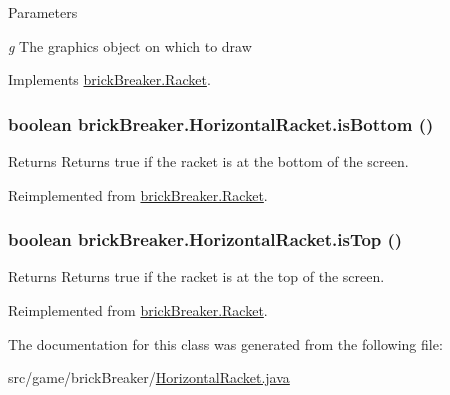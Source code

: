 \begin{DoxyParams}{Parameters}
\item[{\em g}]The graphics object on which to draw \end{DoxyParams}


Implements \hyperlink{classbrick_breaker_1_1_racket_a6ca0308def67e0955522a0e0beb430e9}{brickBreaker.Racket}.

\hypertarget{classbrick_breaker_1_1_horizontal_racket_aef823257f470172eb2caacfa95a61b99}{
\subsubsection[{isBottom}]{\setlength{\rightskip}{0pt plus 5cm}boolean brickBreaker.HorizontalRacket.isBottom ()}}
\label{classbrick_breaker_1_1_horizontal_racket_aef823257f470172eb2caacfa95a61b99}
\begin{DoxyReturn}{Returns}
Returns true if the racket is at the bottom of the screen. 
\end{DoxyReturn}


Reimplemented from \hyperlink{classbrick_breaker_1_1_racket_a908f0a42e73739db9fd0734d6a4fdb2f}{brickBreaker.Racket}.

\hypertarget{classbrick_breaker_1_1_horizontal_racket_a12688619999a3e4d302449ab4bcd0e3d}{
\subsubsection[{isTop}]{\setlength{\rightskip}{0pt plus 5cm}boolean brickBreaker.HorizontalRacket.isTop ()}}
\label{classbrick_breaker_1_1_horizontal_racket_a12688619999a3e4d302449ab4bcd0e3d}
\begin{DoxyReturn}{Returns}
Returns true if the racket is at the top of the screen. 
\end{DoxyReturn}


Reimplemented from \hyperlink{classbrick_breaker_1_1_racket_a0bd80cbd11ffe9afd6212e2d96a88554}{brickBreaker.Racket}.



The documentation for this class was generated from the following file:\begin{DoxyCompactItemize}
\item 
src/game/brickBreaker/\hyperlink{_horizontal_racket_8java}{HorizontalRacket.java}\end{DoxyCompactItemize}
